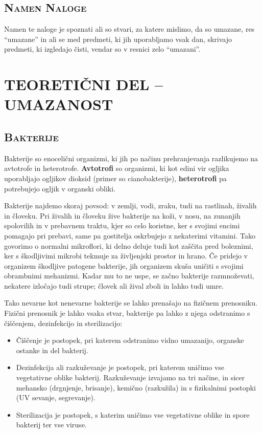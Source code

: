 \documentclass[12pt, a4paper, oneside]{report}
\begin{document}
\section{\textsc{Namen Naloge}}

Namen te naloge je spoznati ali so stvari, za katere mislimo, da so umazane, res ``umazane'' in ali se med predmeti, ki jih uporabljamo vsak dan, skrivajo predmeti, ki izgledajo čisti, vendar so v resnici zelo ``umazani''.

\chapter{TEORETIČNI DEL -- UMAZANOST}

\section{\textsc{Bakterije}}

Bakterije so enocelični organizmi, ki jih po načinu prehranjevanja razlikujemo na avtotrofe in heterotrofe. \textbf{Avtotrofi} so organizmi, ki kot edini vir ogljika uporabljajo ogljikov dioksid (primer so cianobakterije), \textbf{heterotrofi} pa potrebujejo ogljik v organski obliki.

Bakterije najdemo skoraj povsod: v zemlji, vodi, zraku, tudi na rastlinah, živalih in človeku. Pri živalih in človeku žive bakterije na koži, v nosu, na zunanjih spolovilih in v prebavnem traktu, kjer so celo koristne, ker s svojimi encimi pomagajo pri prebavi, same pa gostitelja oskrbujejo z nekaterimi vitamini. Tako govorimo o normalni mikroflori, ki delno deluje tudi kot zaščita pred boleznimi, ker s škodljivimi mikrobi tekmuje za življenjski prostor in hrano. Če pridejo v organizem škodljive patogene bakterije, jih organizem skuša uničiti s svojimi obrambnimi mehanizmi. Kadar mu to ne uspe, se začno bakterije razmnoževati, nekatere izločajo tudi strupe; človek ali žival zboli in lahko tudi umre.

Tako nevarne kot nenevarne bakterije se lahko prenašajo na fizičnem prenosniku. Fizični prenosnik je lahko vsaka stvar, bakterije pa lahko z njega odstranimo s čiščenjem, dezinfekcijo in sterilizacijo:
\begin{itemize}
\item Čiščenje je postopek, pri katerem odstranimo vidno umazanijo, organske ostanke in del bakterij.
\item Dezinfekcija ali razkuževanje je postopek, pri katerem uničimo vse vegetativne oblike bakterij. Razkuževanje izvajamo na tri načine, in sicer mehansko (drgnjenje, brisanje), kemično (razkužila) in s fizikalnimi postopki (UV sevanje, segrevanje).
\item Sterilizacija je postopek, s katerim uničimo vse vegetativne oblike in spore bakterij ter vse viruse.
\end{itemize}
\end{document}
